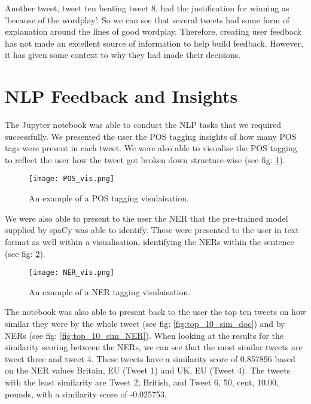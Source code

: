 	Another tweet, tweet ten beating tweet 8, had the justification for winning as 'because of the wordplay'. So we can see that several tweets had some form of explanation around the lines of good wordplay. Therefore, creating user feedback has not made an excellent source of information to help build feedback. However, it has given some context to why they had made their decisions.


\section{NLP Feedback and Insights}
\label{sec:reaults_NLP}
	
	The Jupyter notebook was able to conduct the NLP tasks that we required successfully. We presented the user the POS tagging insights of how many POS tags were present in each tweet. We were also able to visualise the POS tagging to reflect the user how the tweet got broken down structure-wise (see fig: \ref{fig:POS_example}).
	
	\begin{figure}[h]
		\centering
		\texttt{[image: POS\_vis.png]}
		\caption{An example of a POS tagging visulaisation.}
		\label{fig:POS_example}
		
	\end{figure}

	We were also able to present to the user the NER that the pre-trained model supplied by spaCy was able to identify. These were presented to the user in text format as well within a visualisation, identifying the NERs within the sentence (see fig: \ref{fig:NER_example}).
	
	\begin{figure}[h]
		\centering
		\texttt{[image: NER\_vis.png]}
		\caption{An example of a NER tagging visulaisation.}
		\label{fig:NER_example}
		
	\end{figure}

	The notebook was also able to present back to the user the top ten tweets on how similar they were by the whole tweet (see fig: \ref{fig:top_10_sim_doc}) and by NERs (see fig: \ref{fig:top_10_sim_NER}). When looking at the results for the similarity scoring between the NERs, we can see that the most similar tweets are tweet three and tweet 4. These tweets have a similarity score of 0.857896 based on the NER values Britain, EU (Tweet 1) and UK, EU (Tweet 4). The tweets with the least similarity are Tweet 2, British, and Tweet 6, 50, cent, 10.00, pounds, with a similarity score of -0.025753.
	 
